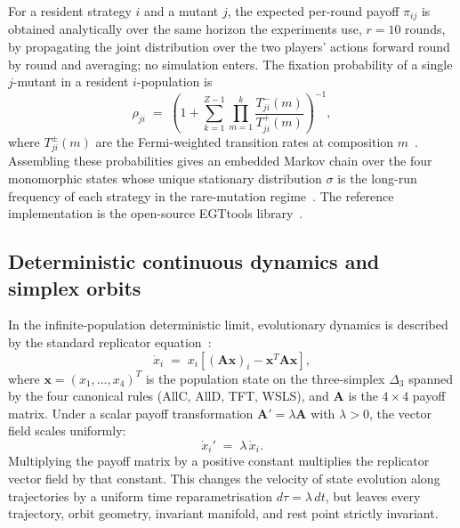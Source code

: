 \documentclass[openacc]{rsproca_new}
\newcommand{\lam}{\lambda}
\begin{document}
For a resident strategy $i$ and a mutant $j$, the expected per-round payoff
$\pi_{ij}$ is obtained analytically over the same horizon the experiments use,
$r = 10$ rounds, by propagating the joint distribution over the two players'
actions forward round by round and averaging; no simulation enters. The
fixation probability of a single $j$-mutant in a resident $i$-population is
\begin{equation}
\rho_{ji} \;=\; \left(1 + \sum_{k=1}^{Z-1}\prod_{m=1}^{k}
   \frac{T^{-}_{ji}(m)}{T^{+}_{ji}(m)}\right)^{-1},
\label{eq:fixation}
\end{equation}
where $T^{\pm}_{ji}(m)$ are the Fermi-weighted transition rates at composition
$m$~\cite{szabo1998evolutionary}. Assembling these probabilities gives an
embedded Markov chain over the four monomorphic states whose unique stationary
distribution $\sigma$ is the long-run frequency of each strategy in the
rare-mutation regime~\cite{sigmund:2010bo}. The reference implementation is
the open-source EGTtools library~\cite{domingos2023egttools}.

\subsection{Deterministic continuous dynamics and simplex orbits}\label{appendix:egt_simplex}

In the infinite-population deterministic limit, evolutionary dynamics is
described by the standard replicator equation~\cite{sigmund:2010bo,nowak2006five}:
\begin{equation}
\dot{x}_i \;=\; x_i \left[ (\mathbf{A}\mathbf{x})_i - \mathbf{x}^T \mathbf{A} \mathbf{x} \right],
\label{eq:replicator}
\end{equation}
where $\mathbf{x} = (x_1, \dots, x_4)^T$ is the population state on the
three-simplex $\Delta_3$ spanned by the four canonical rules (AllC, AllD, TFT,
WSLS), and $\mathbf{A}$ is the $4 \times 4$ payoff matrix. Under a scalar payoff
transformation $\mathbf{A}' = \lam \mathbf{A}$ with $\lam > 0$, the vector field
scales uniformly:
\begin{equation}
\dot{x}_i' \;=\; \lam \, \dot{x}_i.
\label{eq:replicator_scaled}
\end{equation}
Multiplying the payoff matrix by a positive constant multiplies the replicator
vector field by that constant. This changes the velocity of state evolution along
trajectories by a uniform time reparametrisation $d\tau = \lam \, dt$, but leaves
every trajectory, orbit geometry, invariant manifold, and rest point strictly
invariant.
\end{document}
